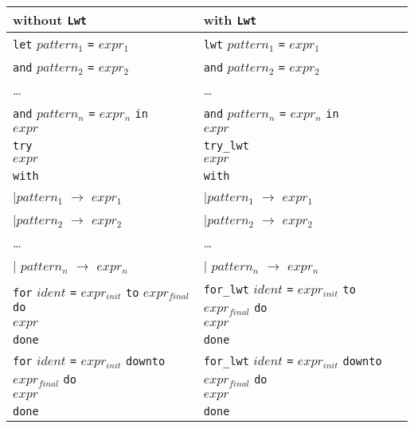 \documentclass{article}
\newcommand{\lwt}{\texttt{Lwt}\xspace}
\begin{document}
\begin{center}
  \begin{tabular}{|l|l|}
    \hline

    \textbf{without \lwt} & \textbf{with \lwt} \\

    \hline

    \texttt{let} $pattern_1$ \texttt{=} $expr_1$ &
    \texttt{lwt} $pattern_1$ \texttt{=} $expr_1$ \\
    \texttt{and} $pattern_2$ \texttt{=} $expr_2$ &
    \texttt{and} $pattern_2$ \texttt{=} $expr_2$ \\
    \dots &
    \dots \\
    \texttt{and} $pattern_n$ \texttt{=} $expr_n$ \texttt{in} &
    \texttt{and} $pattern_n$ \texttt{=} $expr_n$ \texttt{in} \\
    $expr$ &
    $expr$ \\

    \hline

    \texttt{try} &
    \texttt{try\_lwt} \\
    \:\: $expr$ &
    \:\: $expr$ \\
    \texttt{with} &
    \texttt{with} \\
    \:\: $\mid pattern_1$ \texttt{$\rightarrow$} $expr_1$ &
    \:\: $\mid pattern_1$ \texttt{$\rightarrow$} $expr_1$ \\
    \:\: $\mid pattern_2$ \texttt{$\rightarrow$} $expr_2$ &
    \:\: $\mid pattern_2$ \texttt{$\rightarrow$} $expr_2$ \\
    \:\: \dots &
    \:\: \dots \\
    \:\: $\mid$ $pattern_n$ \texttt{$\rightarrow$} $expr_n$ &
    \:\: $\mid$ $pattern_n$ \texttt{$\rightarrow$} $expr_n$ \\

    \hline

    \texttt{for} $ident$ \texttt{=} $expr_{init}$ \texttt{to} $expr_{final}$ \texttt{do} &
    \texttt{for\_lwt} $ident$ \texttt{=} $expr_{init}$ \texttt{to} $expr_{final}$ \texttt{do} \\
    \:\: $expr$ &
    \:\: $expr$ \\
    \texttt{done} &
    \texttt{done} \\

    \hline

    \texttt{for} $ident$ \texttt{=} $expr_{init}$ \texttt{downto} $expr_{final}$ \texttt{do} &
    \texttt{for\_lwt} $ident$ \texttt{=} $expr_{init}$ \texttt{downto} $expr_{final}$ \texttt{do} \\
    \:\: $expr$ &
    \:\: $expr$ \\
    \texttt{done} &
    \texttt{done} \\

    \hline
  \end{tabular}
\end{center}
\end{document}
